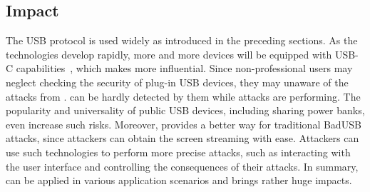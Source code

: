 \subsection{Impact}

The \ac{USB} protocol is used widely as introduced in the preceding sections.  As the
technologies develop rapidly, more and more devices will be equipped with USB-C
capabilities~\cite{li2018usb}, which makes \tool more influential.  
Since non-professional users may neglect checking the security of plug-in \ac{USB} devices, 
they may unaware of the attacks from \tool.
can be hardly detected by them while attacks are performing.  
The popularity and universality of public \ac{USB} devices, including sharing power banks, even
increase such risks.  Moreover, \tool provides a better way for traditional
BadUSB attacks, since attackers can obtain the screen streaming with ease.
Attackers can use such technologies to perform more precise attacks, such as
interacting with the user interface and controlling the consequences of their
attacks.  In summary, \tool can be applied in various application scenarios and
brings rather huge impacts.
